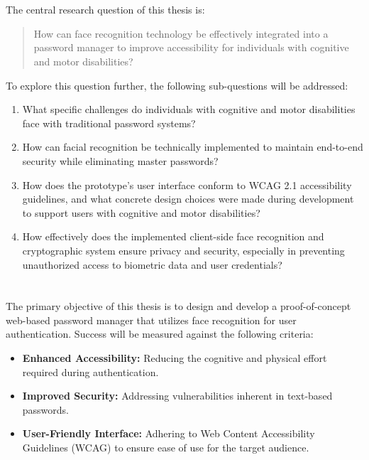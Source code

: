 \clearpage

\section{}%
\label{sec:onderzoeksvraag}

The central research question of this thesis is:
\begin{quote}
How can face recognition technology be effectively integrated into a password manager to improve accessibility for individuals with cognitive and motor disabilities?
\end{quote}

To explore this question further, the following sub-questions will be addressed:
\begin{enumerate}
  \item What specific challenges do individuals with cognitive and motor disabilities face with traditional password systems?
  \item How can facial recognition be technically implemented to maintain end-to-end security while eliminating master passwords?
  \item How does the prototype’s user interface conform to WCAG 2.1 accessibility guidelines, and what concrete design choices were made during development to support users with cognitive and motor disabilities?
  \item How effectively does the implemented client-side face recognition and cryptographic system ensure privacy and security, especially in preventing unauthorized access to biometric data and user credentials?
\end{enumerate}

\section{}%
\label{sec:onderzoeksdoelstelling}

The primary objective of this thesis is to design and develop a proof-of-concept web-based password manager that utilizes face recognition for user authentication. Success will be measured against the following criteria:
\begin{itemize}
  \item \textbf{Enhanced Accessibility:} Reducing the cognitive and physical effort required during authentication.
  \item \textbf{Improved Security:} Addressing vulnerabilities inherent in text-based passwords.
  \item \textbf{User-Friendly Interface:} Adhering to Web Content Accessibility Guidelines (WCAG) to ensure ease of use for the target audience.
\end{itemize}

